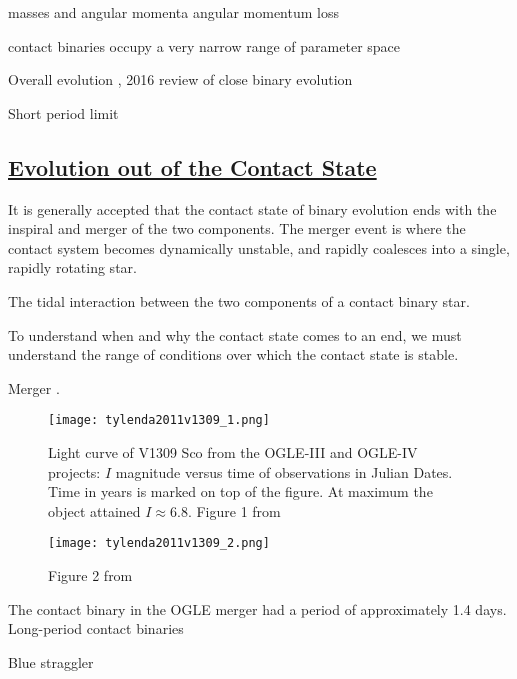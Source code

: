 \documentclass[12pt]{article} %
\numberwithin{equation}{section} %
\begin{document}
masses and angular momenta \citep{gazeas2006masses} angular momentum loss \citep{vilhu1981contact}

contact binaries occupy a very narrow range of parameter space \citep{gazeas2009physical} \citep{awadalla2005absolute}

Overall evolution \citep{stepien2008evolutionary}, 2016 review of close binary evolution \citep{tutukov2016evolution}

Short period limit \citep{rucinski2007short} \citep{drake2014ultra} \cite{lohr2012period} \citep{rucinski1992can}

\subsection[Evolution out of the Contact State]{\hyperlink{toc}{Evolution out of the Contact State}}

It is generally accepted that the contact state of binary evolution ends with the inspiral and merger of the two components. The merger event is where the contact system becomes dynamically unstable, and rapidly coalesces into a single, rapidly rotating star. 

The tidal interaction between the two components of a contact binary star.

To understand when and why the contact state comes to an end, we must understand the range of conditions over which the contact state is stable.

Merger \citet{tylenda2011v1309}.

\begin{figure}[H]
\centering
\texttt{[image: tylenda2011v1309\_1.png]}
\caption{Light curve of V1309 Sco from the OGLE-III and OGLE-IV projects: $I$ magnitude versus time of observations in Julian Dates. Time in years is marked on top of the figure. At maximum the object attained $I \approx 6.8$. Figure 1 from \citet{tylenda2011v1309}}
\label{fig: tylenda2011v1309_1}
\end{figure}

\begin{figure}[H]
\centering
\texttt{[image: tylenda2011v1309\_2.png]}
\caption{Figure 2 from \citet{tylenda2011v1309}}
\label{fig: tylenda2011v1309_2}
\end{figure}


The contact binary in the OGLE merger had a period of approximately 1.4 days. Long-period contact binaries \citep{rucinski1998eclipsing} 

Blue straggler \citet{andronov2006mergers}
\end{document}

